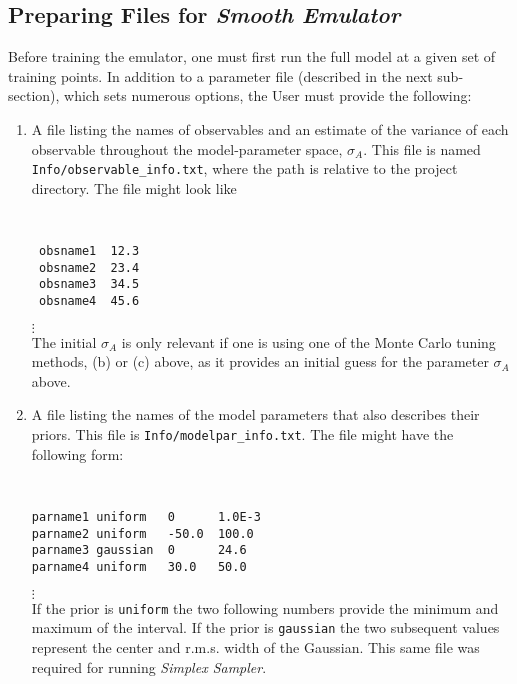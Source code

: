 \documentclass[UserManual.tex]{subfiles}
\begin{document}
\subsection{Preparing Files for {\it Smooth Emulator}}

Before training the emulator, one must first run the full model at a given set of training points. In addition to a parameter file (described in the next sub-section), which sets numerous options, the User must provide the following:
\begin{enumerate}\itemsep=0pt
\item A file listing the names of observables and an estimate of the variance of each observable throughout the model-parameter space, $\sigma_A$. This file is named {\tt Info/observable\_info.txt}, where the path is relative to the project directory. The file might look like
{\tt
\begin{verbatim}
 obsname1  12.3  
 obsname2  23.4 
 obsname3  34.5
 obsname4  45.6  
\end{verbatim}}
\vspace*{-16pt}
 \hspace*{28pt}$\vdots$\\
The initial $\sigma_A$ is only relevant if one is using one of the Monte Carlo tuning methods, (b) or (c) above, as it provides an initial guess for the parameter $\sigma_A$ above.

\item A file listing the names of the model parameters that also describes their priors. This file is {\tt Info/modelpar\_info.txt}. The file might have the following form:
{\tt
\begin{verbatim}
parname1 uniform   0      1.0E-3
parname2 uniform   -50.0  100.0
parname3 gaussian  0      24.6
parname4 uniform   30.0   50.0
\end{verbatim}}
\vspace*{-16pt}
 \hspace*{28pt}$\vdots$\\
If the prior is {\tt uniform} the two following numbers provide the minimum and maximum of the interval. If the prior is {\tt gaussian} the two subsequent values represent the center and r.m.s. width of the Gaussian. This same file was required for running {\it Simplex Sampler}.


\end{enumerate}
\end{document}
